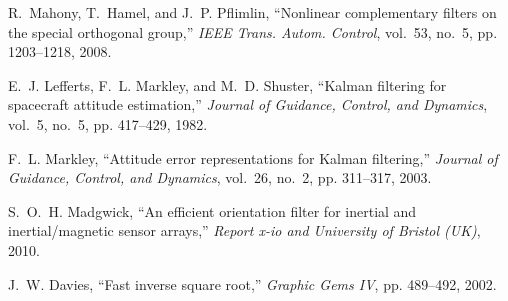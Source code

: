 \documentclass[12pt]{article}
\begin{document}
\begin{thebibliography}{9}
R.~Mahony, T.~Hamel, and J.~P. Pflimlin, “Nonlinear complementary filters on the special orthogonal group,” \emph{IEEE Trans. Autom. Control}, vol.~53, no.~5, pp. 1203–1218, 2008.

E.~J. Lefferts, F.~L. Markley, and M.~D. Shuster, “Kalman filtering for spacecraft attitude estimation,” \emph{Journal of Guidance, Control, and Dynamics}, vol.~5, no.~5, pp. 417–429, 1982.

F.~L. Markley, “Attitude error representations for Kalman filtering,” \emph{Journal of Guidance, Control, and Dynamics}, vol.~26, no.~2, pp. 311–317, 2003.

S.~O.~H. Madgwick, “An efficient orientation filter for inertial and inertial/magnetic sensor arrays,” \emph{Report x-io and University of Bristol (UK)}, 2010.

J.~W. Davies, “Fast inverse square root,” \emph{Graphic Gems IV}, pp. 489–492, 2002.

\end{thebibliography}
\end{document}
